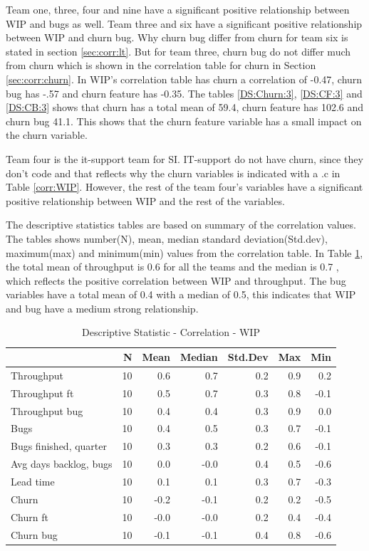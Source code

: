 \documentclass[UKenglish]{ifimaster}  %
\begin{document}
Team one, three, four and nine have a significant positive relationship between WIP and bugs as well. Team three and six have a significant positive relationship between WIP and churn bug. Why churn bug differ from churn for team six is stated in section \ref{sec:corr:lt}. But for team three, churn bug do not differ much from churn which is shown in the correlation table for churn in Section \ref{sec:corr:churn}. In WIP's correlation table has churn a correlation of -0.47, churn bug has -.57 and churn feature has -0.35.  The tables \ref{DS:Churn:3}, \ref{DS:CF:3} and \ref{DS:CB:3} shows that churn has a total mean of 59.4, churn feature has 102.6 and churn bug 41.1. This shows that the churn feature variable has a small impact on the churn variable.

Team four is the it-support team for SI.  IT-support do not have churn, since they don't code and that reflects why the churn variables is indicated with a .c in Table \ref{corr:WIP}. However, the rest of the team four's variables have a significant positive relationship between WIP and the rest of the variables. 

The descriptive statistics tables are based on summary of the correlation values. The tables shows number(N), mean, median standard deviation(Std.dev), maximum(max)  and minimum(min) values from the correlation table.
In Table \ref{DS:corr:WIP}, the total mean of throughput is 0.6 for all the teams and the median is 0.7 , which reflects the positive correlation between WIP and throughput. The bug variables have a total mean of 0.4 with a median of 0.5, this indicates that WIP and bug have a medium strong relationship. 

\begin{table}[!htbp]
 \centering
 \begin{tabular}{ | l | r | r | r | r | r | r | }
 \hline
& \bf{N} & \bf{Mean} & \bf{Median} & \bf{Std.Dev} & \bf{Max} & \bf{Min} \\ \hline
Throughput  & 10 & 0.6 & 0.7 & 0.2 & 0.9 & 0.2\\ \hline
Throughput ft  & 10 & 0.5 & 0.7 & 0.3 & 0.8 & -0.1\\ \hline
Throughput bug  & 10 & 0.4 & 0.4 & 0.3 & 0.9 & 0.0\\ \hline
Bugs  & 10 & 0.4 & 0.5 & 0.3 & 0.7 & -0.1\\ \hline
Bugs finished, quarter  & 10 & 0.3 & 0.3 & 0.2 & 0.6 & -0.1\\ \hline
Avg days backlog, bugs  & 10 & 0.0 & -0.0 & 0.4 & 0.5 & -0.6\\ \hline
Lead time  & 10 & 0.1 & 0.1 & 0.3 & 0.7 & -0.3\\ \hline
Churn  & 10 & -0.2 & -0.1 & 0.2 & 0.2 & -0.5\\ \hline
Churn ft  & 10 & -0.0 & -0.0 & 0.2 & 0.4 & -0.4\\ \hline
Churn bug  & 10 & -0.1 & -0.1 & 0.4 & 0.8 & -0.6\\ \hline
\end{tabular}
 \caption{Descriptive Statistic - Correlation - WIP}
 \label{DS:corr:WIP}
 \end{table}
\end{document}
